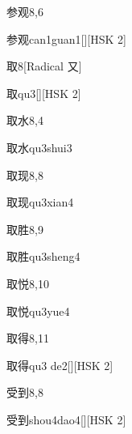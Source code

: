 \begin{entry}{参观}{8,6}
  \begin{phonetics}{参观}{can1guan1}[][HSK 2]
  \end{phonetics}
\end{entry}

\begin{entry}{取}{8}[Radical 又]
  \begin{phonetics}{取}{qu3}[][HSK 2]
  \end{phonetics}
\end{entry}

\begin{entry}{取水}{8,4}
  \begin{phonetics}{取水}{qu3shui3}
  \end{phonetics}
\end{entry}

\begin{entry}{取现}{8,8}
  \begin{phonetics}{取现}{qu3xian4}
  \end{phonetics}
\end{entry}

\begin{entry}{取胜}{8,9}
  \begin{phonetics}{取胜}{qu3sheng4}
  \end{phonetics}
\end{entry}

\begin{entry}{取悦}{8,10}
  \begin{phonetics}{取悦}{qu3yue4}
  \end{phonetics}
\end{entry}

\begin{entry}{取得}{8,11}
  \begin{phonetics}{取得}{qu3 de2}[][HSK 2]
  \end{phonetics}
\end{entry}

\begin{entry}{受到}{8,8}
  \begin{phonetics}{受到}{shou4dao4}[][HSK 2]
  \end{phonetics}
\end{entry}


